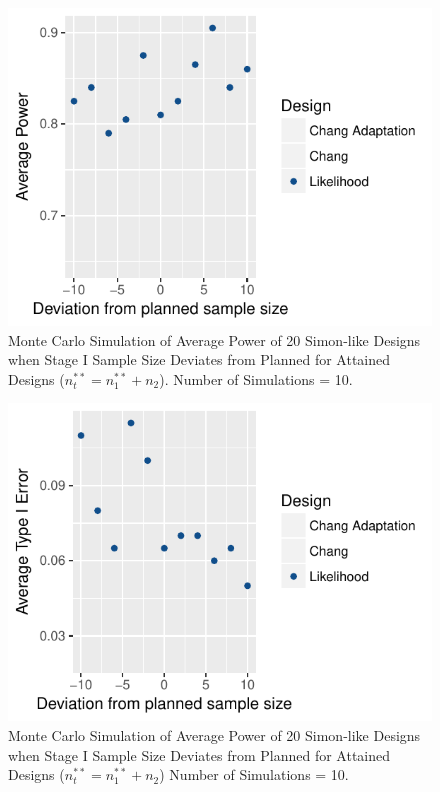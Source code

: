 \documentclass[12pt]{report}\usepackage[]{graphicx}\usepackage[]{color}
\newlength{\li}\setlength{\li}{14.48pt}
\begin{document}
\begin{figure}[]
\caption{Monte Carlo Simulation of Average Power of 20 Simon-like Designs when Stage I Sample Size Deviates from Planned for Attained Designs ($n_t^{\ast\ast} = n_1^{\ast\ast} + n_2$). Number of Simulations = 10.}
\centering
\begin{Schunk}


\centerline{\includegraphics{unnamed-chunk-5-1} }

\end{Schunk}
\end{figure}
\begin{figure}[]
\caption{Monte Carlo Simulation of Average Power of 20 Simon-like Designs when Stage I Sample Size Deviates from Planned for Attained Designs ($n_t^{\ast\ast} = n_1^{\ast\ast} + n_2$) Number of Simulations = 10.}
\centering
\begin{Schunk}


\centerline{\includegraphics{unnamed-chunk-6-1} }

\end{Schunk}
\end{figure}
\end{document}
